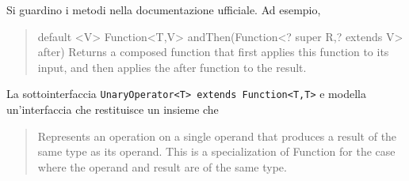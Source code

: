 \documentclass[\fontsizeclass,twocolumn]{\classname}
\theoremstyle{definition}
\theoremstyle{definition}
\begin{document}
Si guardino i metodi nella documentazione ufficiale. Ad esempio,
\begin{quote}
    \footnotesize{default <V> Function<T,V>	andThen(Function<? super R,? extends V> after)	
Returns a composed function that first applies this function to its input, and then applies the after function to the result.}
\end{quote}


La sottointerfaccia \texttt{UnaryOperator<T> extends Function<T,T>} e modella
un'interfaccia che restituisce un insieme che 
\begin{quote}
    \footnotesize{Represents an operation on a single operand that produces a
    result of the same type as its operand. This is a specialization of
Function for the case where the operand and result are of the same type.}
\end{quote}
\end{document}
